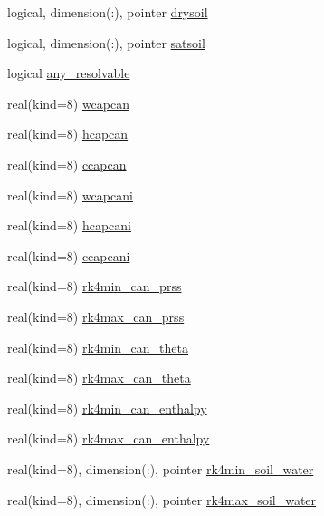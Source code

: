 \begin{DoxyCompactItemize}
\item 
logical, dimension(\+:), pointer \hyperlink{structrk4__coms_1_1rk4auxtype_ad5d4af75e8d2d89db474d1a0e3778559}{drysoil}
\item 
logical, dimension(\+:), pointer \hyperlink{structrk4__coms_1_1rk4auxtype_a54fe72b55c0b02258c500c320ef5f4c4}{satsoil}
\item 
logical \hyperlink{structrk4__coms_1_1rk4auxtype_a52fa0f229b3b113b88d51fbf660ba252}{any\+\_\+resolvable}
\item 
real(kind=8) \hyperlink{structrk4__coms_1_1rk4auxtype_aaf2a25af6a8bc658149b4cce183ebdfd}{wcapcan}
\item 
real(kind=8) \hyperlink{structrk4__coms_1_1rk4auxtype_a845d117ee787d371b1763dd8184940c5}{hcapcan}
\item 
real(kind=8) \hyperlink{structrk4__coms_1_1rk4auxtype_a2f892540a14b2537735bc5404d2f85ae}{ccapcan}
\item 
real(kind=8) \hyperlink{structrk4__coms_1_1rk4auxtype_af38a4e719b1ba86c3cfd3bb54942de0e}{wcapcani}
\item 
real(kind=8) \hyperlink{structrk4__coms_1_1rk4auxtype_a5788139145741a12572c723924fd7d34}{hcapcani}
\item 
real(kind=8) \hyperlink{structrk4__coms_1_1rk4auxtype_a9ae387bbc1d6b912953285b3b554faf4}{ccapcani}
\item 
real(kind=8) \hyperlink{structrk4__coms_1_1rk4auxtype_af4a8f26ccba83eebc5c9b1cdb107fa52}{rk4min\+\_\+can\+\_\+prss}
\item 
real(kind=8) \hyperlink{structrk4__coms_1_1rk4auxtype_af02afface6d80ed04434f16e516e1888}{rk4max\+\_\+can\+\_\+prss}
\item 
real(kind=8) \hyperlink{structrk4__coms_1_1rk4auxtype_a6e319732ebce1794f3f933f4adbc6bb4}{rk4min\+\_\+can\+\_\+theta}
\item 
real(kind=8) \hyperlink{structrk4__coms_1_1rk4auxtype_acc432079f33d183614afd8e3896be33e}{rk4max\+\_\+can\+\_\+theta}
\item 
real(kind=8) \hyperlink{structrk4__coms_1_1rk4auxtype_a44b86f2c1f9c6d5e25bc0e4f88bb21db}{rk4min\+\_\+can\+\_\+enthalpy}
\item 
real(kind=8) \hyperlink{structrk4__coms_1_1rk4auxtype_ad1c0bd59bd326f66a5eca71eef48e52c}{rk4max\+\_\+can\+\_\+enthalpy}
\item 
real(kind=8), dimension(\+:), pointer \hyperlink{structrk4__coms_1_1rk4auxtype_a8520b0ab485e69fee8994a4088a2ca00}{rk4min\+\_\+soil\+\_\+water}
\item 
real(kind=8), dimension(\+:), pointer \hyperlink{structrk4__coms_1_1rk4auxtype_ad7e445d3349c1fadb022d18cc3c34d3b}{rk4max\+\_\+soil\+\_\+water}
\end{DoxyCompactItemize}


